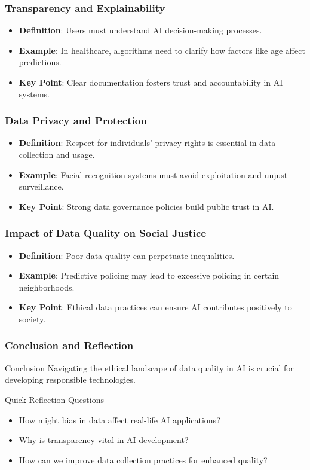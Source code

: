 \documentclass[aspectratio=169]{beamer}
\begin{document}
\begin{frame}[fragile]
    \frametitle{Transparency and Explainability}
    \begin{itemize}
        \item \textbf{Definition}: Users must understand AI decision-making processes.
        \item \textbf{Example}: In healthcare, algorithms need to clarify how factors like age affect predictions.
        \item \textbf{Key Point}: Clear documentation fosters trust and accountability in AI systems.
    \end{itemize}
\end{frame}

\begin{frame}[fragile]
    \frametitle{Data Privacy and Protection}
    \begin{itemize}
        \item \textbf{Definition}: Respect for individuals' privacy rights is essential in data collection and usage.
        \item \textbf{Example}: Facial recognition systems must avoid exploitation and unjust surveillance.
        \item \textbf{Key Point}: Strong data governance policies build public trust in AI.
    \end{itemize}
\end{frame}

\begin{frame}[fragile]
    \frametitle{Impact of Data Quality on Social Justice}
    \begin{itemize}
        \item \textbf{Definition}: Poor data quality can perpetuate inequalities.
        \item \textbf{Example}: Predictive policing may lead to excessive policing in certain neighborhoods.
        \item \textbf{Key Point}: Ethical data practices can ensure AI contributes positively to society.
    \end{itemize}
\end{frame}

\begin{frame}[fragile]
    \frametitle{Conclusion and Reflection}
    \begin{block}{Conclusion}
        Navigating the ethical landscape of data quality in AI is crucial for developing responsible technologies.
    \end{block}

    \begin{block}{Quick Reflection Questions}
        \begin{itemize}
            \item How might bias in data affect real-life AI applications?
            \item Why is transparency vital in AI development?
            \item How can we improve data collection practices for enhanced quality?
        \end{itemize}
    \end{block}
\end{frame}
\end{document}
